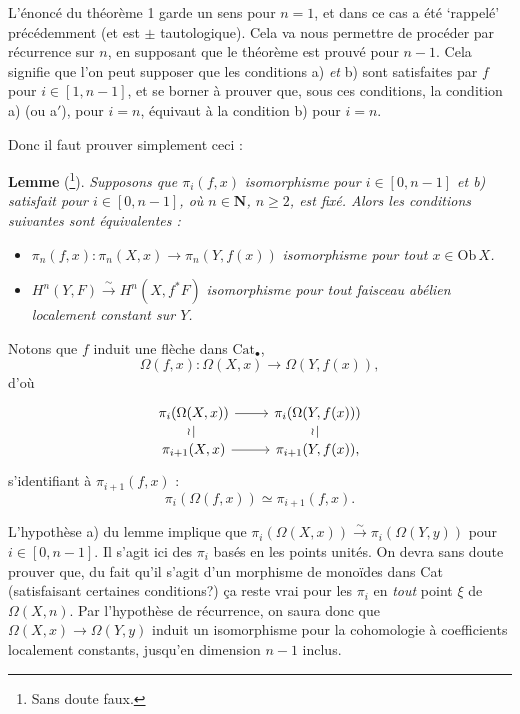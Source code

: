 \documentclass[11pt]{article}
\newcommand{\printedpage}[1]{\marginpar{\footnotesize p.~#1}}
\newcommand{\msp}[1]{\marginpar{\footnotesize [#1]}}
\newcommand{\Ob}{\mathrm{Ob}\,}
\begin{document}
L'énoncé du théorème 1 garde un sens pour $n = 1$, et dans ce cas a été `rappelé' précédemment (et est $\pm$ tautologique). Cela va nous permettre de procéder par récurrence sur $n$, en supposant que le théorème est prouvé pour $n-1$. Cela signifie que l'on peut supposer que les conditions a) \textit{et} b) sont satisfaites par $f$ pour $i \in [1,n-1]$, et se borner à prouver que, sous ces conditions, la condition a) (ou a$'$), pour $i = n$, équivaut à la condition b) pour $i = n$.

\msp{page 177}

Donc il faut prouver simplement ceci :

\textbf{Lemme} (\footnote[115]{Sans doute faux.}). \textit{Supposons que $\pi_i(f,x)$} \textit{isomorphisme pour $i \in [0,n-1]$ et b) satisfait pour $i \in [0,n-1]$, où $n \in \mathbf{N}$, $n \geq 2$, est fixé. Alors les conditions suivantes sont équivalentes :}

\begin{itemize}
\item[\textit{a)}] $\pi_n(f,x) : \pi_n(X,x) \longrightarrow \pi_n(Y,f(x))$ \textit{isomorphisme pour tout $x \in \Ob X$.}

\item[\textit{b)}] $H^n(Y,F) \xrightarrow{\sim} H^n(X,f^*F)$ \textit{isomorphisme pour tout faisceau abélien localement constant sur $Y$.}
\end{itemize}

Notons que $f$ induit une flèche dans $\mathrm{Cat}_\bullet$,
\[
\Omega(f,x) : \Omega(X,x) \longrightarrow \Omega(Y,f(x)),
\]
d'où
\[
\begin{tikzcd}[row sep=small]
\pi_i(\Omega(X,x)) \arrow[r] \arrow[d, dash, "\wr"'] & \pi_i(\Omega(Y,f(x))) \arrow[d, dash, "\wr"'] \\
\pi_{i+1}(X,x) \arrow[r] & \pi_{i+1}(Y,f(x)),
\end{tikzcd}
\]
s'identifiant à $\pi_{i+1}(f,x)$ :
\[
\pi_i(\Omega(f,x)) \simeq \pi_{i+1}(f,x).
\]

\clearpage

\printedpage{119}

L'hypothèse a) du lemme implique que $\pi_i(\Omega(X,x)) \xrightarrow{\sim} \pi_i(\Omega(Y,y))$ pour $i \in [0,n-1]$. Il s'agit ici des $\pi_i$ basés en les points unités. On devra sans doute prouver que, du fait qu'il s'agit d'un morphisme de monoïdes dans Cat (satisfaisant certaines conditions?) ça reste vrai pour les $\pi_i$ en \textit{tout} point $\xi$ de $\Omega(X,n)$. Par l'hypothèse de récurrence, on saura donc que $\Omega(X,x) \longrightarrow \Omega(Y,y)$ %
\msp{page 178}
induit un isomorphisme pour la cohomologie à coefficients localement constants, jusqu'en dimension $n-1$ inclus.
\end{document}
